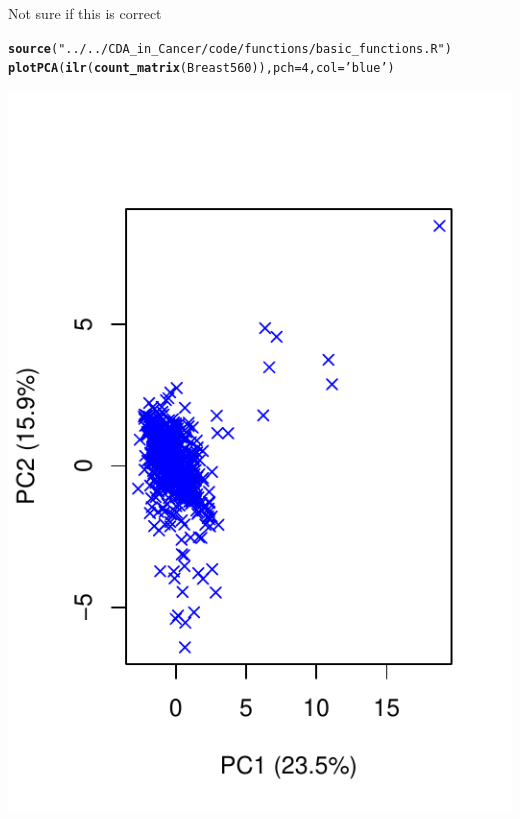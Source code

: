 \documentclass{article}\usepackage[]{graphicx}\usepackage[]{color}
\makeatletter
\def\maxwidth{ %
  \ifdim\Gin@nat@width>\linewidth
    \linewidth
  \else
    \Gin@nat@width
  \fi
}
\newcommand{\hlnum}[1]{\textcolor[rgb]{0.686,0.059,0.569}{#1}}%
\newcommand{\hlstr}[1]{\textcolor[rgb]{0.192,0.494,0.8}{#1}}%
\newcommand{\hlstd}[1]{\textcolor[rgb]{0.345,0.345,0.345}{#1}}%
\newcommand{\hlkwc}[1]{\textcolor[rgb]{0.333,0.667,0.333}{#1}}%
\newcommand{\hlkwd}[1]{\textcolor[rgb]{0.737,0.353,0.396}{\textbf{#1}}}%
\newenvironment{kframe}{%
 \def\at@end@of@kframe{}%
 \ifinner\ifhmode%
  \def\at@end@of@kframe{\end{minipage}}%
  \begin{minipage}{\columnwidth}%
 \fi\fi%
 \def\FrameCommand##1{\hskip\@totalleftmargin \hskip-\fboxsep
 \colorbox{shadecolor}{##1}\hskip-\fboxsep
     \hskip-\linewidth \hskip-\@totalleftmargin \hskip\columnwidth}%
 \MakeFramed {\advance\hsize-\width
   \@totalleftmargin\z@ \linewidth\hsize
   \@setminipage}}%
 {\par\unskip\endMakeFramed%
 \at@end@of@kframe}
\newenvironment{knitrout}{}{} %
\makeatother
\begin{document}
Not sure if this is correct
\begin{knitrout}
\color{fgcolor}\begin{kframe}
\begin{alltt}
\hlkwd{source}\hlstd{(}\hlstr{"../../CDA_in_Cancer/code/functions/basic_functions.R"}\hlstd{)}
\hlkwd{plotPCA}\hlstd{(}\hlkwd{ilr}\hlstd{(}\hlkwd{count_matrix}\hlstd{(Breast560)),} \hlkwc{pch}\hlstd{=}\hlnum{4}\hlstd{,} \hlkwc{col}\hlstd{=}\hlstr{'blue'}\hlstd{)}
\end{alltt}


{\ttfamily\noindent\itshape\color{messagecolor}{\#\# Loading required package: ggplot2}}\end{kframe}
\includegraphics[width=\maxwidth]{figure/unnamed-chunk-13-1} 

\end{knitrout}
\end{document}
